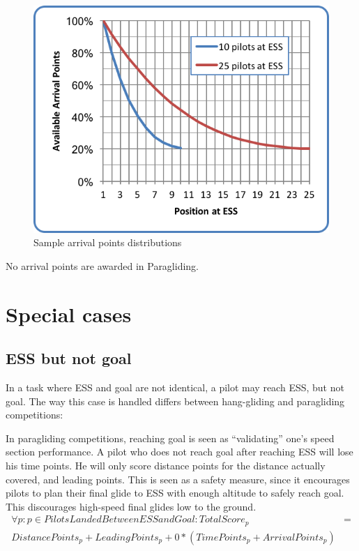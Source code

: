 \documentclass{article}
\begin{document}
\begin{figure}[h]
    \centering
    \includegraphics[scale=0.8]{img/arrival-points.png}
    \caption{Sample arrival points distributions}
\end{figure}

\begin{pg}
No arrival points are awarded in Paragliding.
\end{pg}

\newpage
\section{Special cases}
\subsection{ESS but not goal}
In a task where ESS and goal are not identical, a pilot may reach ESS, but not
goal. The way this case is handled differs between hang-gliding and paragliding
competitions:

\begin{pg}
In paragliding competitions, reaching goal is seen as “validating” one’s speed
section performance. A pilot who does not reach goal after reaching ESS will
lose his time points. He will only score distance points for the distance
actually covered, and leading points. This is seen as a safety measure, since
it encourages pilots to plan their final glide to ESS with enough altitude to
safely reach goal. This discourages high-speed final glides low to the ground.
\begin{align*}
    \forall p : p \in PilotsLandedBetweenESSandGoal : TotalScore_p &= \\
    DistancePoints_p + LeadingPoints_p + 0 * (TimePoints_p + ArrivalPoints_p)
\end{align*}
\end{pg}
\end{document}
